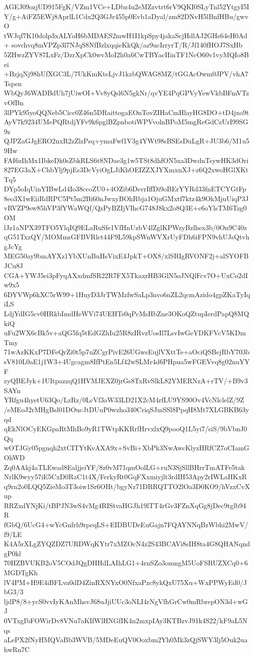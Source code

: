 AGEJ09ozjUD915FgK/VZm1VCe+LDbz4u2eMZzvtrt6rV9QKI0SLyTnl52YtgyI5I
Y/g+AiFZ5EWj8AprlL1Cdx2Q3GJr455p0Evb1aDyal/zm82DNvH5lBnfHBu/gwvO
tWJqf7K10dolp3xALYoH6bMDAES2mwH1I1kpSpy4jakaScjHdlAJ2GHs64eH0Ad+
sovchvq8mVPZp3l7NJqS8NfBzlxqqieKkQk/az9ucIrryrT/R/Jf140fHOJ7SxHb
5ZHwzZYV87LxFz/DzrXpCk0wvMoI2h0a6CwTBYacIIinTF1NcO60v1vyMQIo8Bei
+BzjqNj98hUfXGC3L/7UkKmKteLjvJ1kzbQWAG8MZ/tGGAcOwm0JPV/vhA7Tspen
WbQyJ6WADBdUh7jUiwOI+Vv8yQsl6N5gkNr/qvYE4PqGPVyYewVkbBFmVTzvOfBn
3lPYk95yoQQNeb5Cicc0Z46n5DRaittogaEOnTovZIHaCmHlayHG8DO+tD4jxo9t
AyV7k9234UMePQRtdjYFv9k6pglBZpnbotiWPVvolnBPoM5mgReGdCzUrI99SG9z
QJPZaGJgERO2nxR2zZlzPsq+ymaFwf1V3g4YWt98sBSEsDuLgR+JU3b6/M1u59Hw
FAI6zIhMx1IbkeDk0sZbkRLS6t8NDae3g1w5TSt8dhfON5xa3DwdnTsywHK3dOri
827EG3aX+ChbYlj9pjEs3DcVyiOgLJiKhOEIZZXJYXmxnXJ+z6Q2xwoHGlXKtTq5
DYp5oIqUinYIBwLd4Io38ccoZU0+4OZib6DsvrIffDi9oBErYYRd33fnETCYGtFp
8eo3X1wEiiRdRPC5Pt5m2Bi60nJwxyBOhRbja1OjuGMxtf7ktz4k9OkMjuUiqP3J
vRVZP9sw85hVP3fYWaWQf/QzPyBZIjVIhcG748J8kx2o8Q3E+c6oYlsTM6Tzg0OM
lJz1aNPX39TFO5YlqIQ9ELaRuSfe1VfHnUzbV4lZglKPWzyBzlhex3b/0On9C40z
qG51TxzQY/MOMmsGFBVRlct44F9L59kpSWnWVXrUyFDh6iFPN9vhUJsQtvhgJcYg
MEG50ay9bmAYXz1YbXUnBuHsVixE4JpkT+OX8/xlSRIgRVONF2j+alSYOFBJCu8J
CGA+YWJ5ei3pFyqAXxdmfSR22R7FX5TkaxrHB3GlN5oJNQlFcv7O+UxCo2dIw9x5
6DYVWp6kXC5rW99+1HuyD3JrTWMzfwSaLp3nvo6nZL2qcmAzido4gpZKaTyIqiLS
LdjYdIG5cv0HRkbImdHeWVi74UEHTs0qPcMsHbZne3OKoQZtupIerdPapQ8MQkiQ
uFu2WX6cBk5v+aQG5fq5tEdGZhIu25R8zIRvzUosIl7LsvIwGeYDKFVcV5KDmTmy
71wAzKKxP7DFeQrZi0t5p7uZCgrPivE26UGwsEujlVXttTe+aOciQSBejRbY703b
sV810L0aE1j1W3+4Ugcagm8IfPtEn5Lf42wSLMr4d6PHpua5wFGEVvq8g02nuYYF
zyQBEJyk+1UItpazzqQ1HVMJEXZ0jrGs8TxRvSlkL82YMERNzA+rTV/+B9v3SAYn
YRfgu4hyetU63Qo/LzRz/0LcVf3aW33LD21X2cM4rfLU9YS90Ov4VcNlclelZ/9Z
/eMEoJ2rMHgBsl01DOucJtDUuP0wzho340CriqSJmSSl8PpqH8Mt7XLGBKB63yqd
qEkNlOCyEKGpaRtMhBo9yR1TWtpKKRrfHrvxlxQ9pooQ1L5yi7/siS/9bVbnJ0Qq
wOTJGy05pgnqh2xtCITYtKvAXA9x+SvBi+XbPk3NwAwcKlyzHRfCZ7oCIamGOhWD
Zq0AAkj4aTLEwad8EaljjeiYF/8z0vM71qmOolLG+ruN3SjSllBHrrTmATFe5tak
NrlK9wyy57iE5CxD0RaC1t4X/FerkyRt0GqFXxmiyjlt3rdIH53Apy2rIWLaHKxR
q9rn2o0LQQ5ZieMo3T3oiw1Sr6OHt/bgyNz71DRRQTTO2lOa3D0KO9/hVzxCvXup
RRZxdYNjKi/tBPJN3wS4vMg4RIStvaHGJh19lTT4rGv3FZnXqGg8jDec9tglb94R
fGbQ/6UcG4+wYcGnfrh9rpeqLS+EIDBUDeEuGajn7FQAYNNqBzWbhi2MwV/f9/LE
K4A5rXLgZYQZDZ7URDWqKYtr7xMZOcN4z2S43BCAVi8sIH8ta4G8QHANqndgP0kl
70HZBVUKB2oV5COdJQgDHHdLAIhLG1+4rnSZo3omngM5UoFSRUZXCq0+6MGDTgKh
lV4PM+H9E4iBFLva0dD4ZinRXNYxO0NfxaPzc8ykQxU75Xu+WxPPWyEd0/JbG3/3
ljdP8/8+ycS0vvIyKAnMhsvJ68uJjiUUc3oNLI4rNgVfhGrCw0mRbrepON3d+wGJ
0VTxgIbFOWirDv8VNu7aKIfWlHNGfIK4n2mxpIAy3KTBzvJ91k4S22/kF9aL5Nqs
aLePX2fNyHMQVaBb3WVB/5MDeEuQV0Ooxbm2Yh0Mk3zQjSWY3lj5Ouk2uahwRn7C
